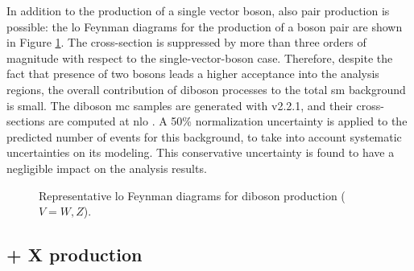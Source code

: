 In addition to the production of a single vector boson, also pair production is possible: 
the \gls{lo} Feynman diagrams for the production of a boson pair are shown in Figure \ref{fig:dib_prod}.
The cross-section is suppressed by more than three orders of magnitude with respect to the 
single-vector-boson case. 
Therefore, despite the fact that presence of two bosons leads a higher acceptance into the analysis regions,
the overall contribution of diboson processes to the total \gls{sm} background is small. 
The diboson \gls{mc} samples are generated with \Sherpa v2.2.1, and their cross-sections are computed at \gls{nlo} \cite{ATL-PHYS-PUB-2016-002,ATL-PHYS-PUB-2017-005}.
A 50\% normalization uncertainty is applied to the predicted number of events for this background, to take into account 
systematic uncertainties on its modeling. This conservative uncertainty is found to have a negligible impact on the analysis results. 


\begin{figure}[h!]
\centering 
{}
\caption{Representative \gls{lo} Feynman diagrams for diboson production  ($V=W, Z$).}\label{fig:dib_prod}
\end{figure}


\subsection{\ttbar + X production}

